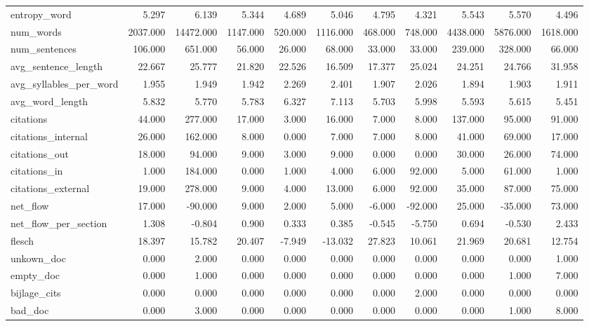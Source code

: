 \begin{tabular}{lrrrrrrrrrr}
\cline{1-11}
entropy\_word & 5.297 & 6.139 & 5.344 & 4.689 & 5.046 & 4.795 & 4.321 & 5.543 & 5.570 & 4.496 \\
\cline{1-11}
num\_words & 2037.000 & 14472.000 & 1147.000 & 520.000 & 1116.000 & 468.000 & 748.000 & 4438.000 & 5876.000 & 1618.000 \\
\cline{1-11}
num\_sentences & 106.000 & 651.000 & 56.000 & 26.000 & 68.000 & 33.000 & 33.000 & 239.000 & 328.000 & 66.000 \\
\cline{1-11}
avg\_sentence\_length & 22.667 & 25.777 & 21.820 & 22.526 & 16.509 & 17.377 & 25.024 & 24.251 & 24.766 & 31.958 \\
\cline{1-11}
avg\_syllables\_per\_word & 1.955 & 1.949 & 1.942 & 2.269 & 2.401 & 1.907 & 2.026 & 1.894 & 1.903 & 1.911 \\
\cline{1-11}
avg\_word\_length & 5.832 & 5.770 & 5.783 & 6.327 & 7.113 & 5.703 & 5.998 & 5.593 & 5.615 & 5.451 \\
\cline{1-11}
citations & 44.000 & 277.000 & 17.000 & 3.000 & 16.000 & 7.000 & 8.000 & 137.000 & 95.000 & 91.000 \\
\cline{1-11}
citations\_internal & 26.000 & 162.000 & 8.000 & 0.000 & 7.000 & 7.000 & 8.000 & 41.000 & 69.000 & 17.000 \\
\cline{1-11}
citations\_out & 18.000 & 94.000 & 9.000 & 3.000 & 9.000 & 0.000 & 0.000 & 30.000 & 26.000 & 74.000 \\
\cline{1-11}
citations\_in & 1.000 & 184.000 & 0.000 & 1.000 & 4.000 & 6.000 & 92.000 & 5.000 & 61.000 & 1.000 \\
\cline{1-11}
citations\_external & 19.000 & 278.000 & 9.000 & 4.000 & 13.000 & 6.000 & 92.000 & 35.000 & 87.000 & 75.000 \\
\cline{1-11}
net\_flow & 17.000 & -90.000 & 9.000 & 2.000 & 5.000 & -6.000 & -92.000 & 25.000 & -35.000 & 73.000 \\
\cline{1-11}
net\_flow\_per\_section & 1.308 & -0.804 & 0.900 & 0.333 & 0.385 & -0.545 & -5.750 & 0.694 & -0.530 & 2.433 \\
\cline{1-11}
flesch & 18.397 & 15.782 & 20.407 & -7.949 & -13.032 & 27.823 & 10.061 & 21.969 & 20.681 & 12.754 \\
\cline{1-11}
unkown\_doc & 0.000 & 2.000 & 0.000 & 0.000 & 0.000 & 0.000 & 0.000 & 0.000 & 0.000 & 1.000 \\
\cline{1-11}
empty\_doc & 0.000 & 1.000 & 0.000 & 0.000 & 0.000 & 0.000 & 0.000 & 0.000 & 1.000 & 7.000 \\
\cline{1-11}
bijlage\_cits & 0.000 & 0.000 & 0.000 & 0.000 & 0.000 & 0.000 & 2.000 & 0.000 & 0.000 & 0.000 \\
\cline{1-11}
bad\_doc & 0.000 & 3.000 & 0.000 & 0.000 & 0.000 & 0.000 & 0.000 & 0.000 & 1.000 & 8.000 \\
\cline{1-11}
\bottomrule
\end{tabular}
